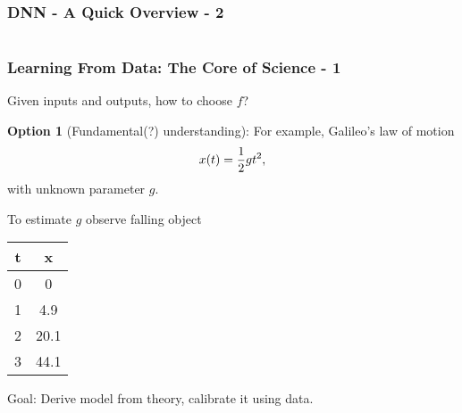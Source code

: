 \documentclass[12pt,fleqn]{beamer}
\begin{document}
\begin{frame}
	\frametitle{DNN - A Quick Overview - 2}
	
	\begin{center}
		\begin{columns}
		
		\end{columns}
	\end{center}
		
		\vspace{5mm}
		\end{frame}
\begin{frame}\frametitle{Learning From Data: The Core of Science - 1}


Given inputs and outputs, how to choose $f$?

\bigskip

\textbf{Option 1} (Fundamental(?) understanding): For example, Galileo's law of motion
$$ x(t) = {\frac 12} g t^2, $$
with unknown parameter $g$. 

\pause

To estimate $g$ observe falling object
\begin{center}
\begin{tabular}{cc}
t   &  x \\ \hline
0  &  0  \\
1  & 4.9  \\
2  & 20.1 \\
3  & 44.1 \\
\end{tabular}
\end{center}

\bigskip

Goal: Derive model from theory, calibrate it using data.

\end{frame}
\end{document}
